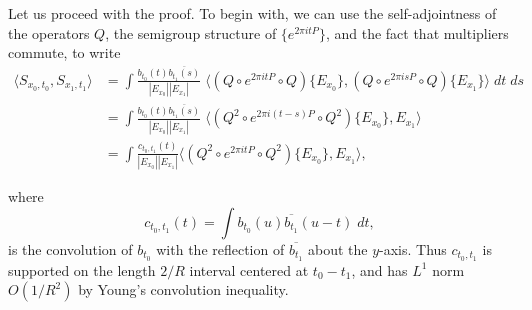 Let us proceed with the proof. To begin with, we can use the self-adjointness of the operators $Q$, the semigroup structure of $\{ e^{2 \pi i t P} \}$, and the fact that multipliers commute, to write
%
\begin{align*}
    \langle {S\!}_{x_0,t_0}, {S\!}_{x_1,t_1} \rangle &= \int \frac{b_{t_0}(t) \overline{b_{t_1}(s)}}{|E_{x_0}| |E_{x_1}|}\; \Big\langle (Q \circ e^{2 \pi i t P} \circ Q) \{ E_{x_0} \}, (Q \circ e^{2 \pi i s P} \circ Q) \{ E_{x_1} \} \Big\rangle\; dt\; ds\\
    &= \int \frac{b_{t_0}(t) \overline{b_{t_1}(s)}}{|E_{x_0}| |E_{x_1}|}\; \Big\langle (Q^2 \circ e^{2 \pi i (t - s) P} \circ Q^2) \{ E_{x_0} \}, E_{x_1} \Big\rangle\\
    &= \int \frac{c_{t_0,t_1}(t)}{|E_{x_0}||E_{x_1}|} \Big\langle (Q^2 \circ e^{2 \pi i t P} \circ Q^2) \{ E_{x_0} \}, E_{x_1} \Big\rangle,
\end{align*}
%
\begin{comment}

The wave propogators $\{ e^{2 \pi i t P} \}$ form a unitary semigroup. As a result, the Lax parametrix $\{ W(t) \}$ also satisfy the semigroup property \emph{modulo smoothing operators}, i.e. there exists a Schwartz operator $B(t,s)$ whose kernel $B(t,s,x,y)$ is smooth, such that
%
\[ W(s)^* \circ W(t) = W(t - s) + B(t,s). \]
%
This smoothness implies that
%
\[ \| \mathcal{P}_\lambda \{ B(t,s,\cdot,y) \} \|_{L^\infty(S^d)} \lesssim_N \lambda^{-N}, \]
%
and this together with the Weyl Law and the triangle inequality is sufficient to conclude that the kernel $K(t,s,x,y)$ of $Q \circ B(t,s)$ satisfies bounds of the form
%
\[ |K(t,s,x,y)| = \left| \sum \beta(\lambda / R) \mathcal{P}_\lambda \{ B(t,s,\cdot,y) \} \right| \lesssim_N R^{-N}. \]
%
Schur's Lemma, applied to $Q \circ B(t,s)$, together with the uniform boundedness of $Q$, implies that
%
\[ \| (Q \circ B(t,s) \circ Q) \{ E_{x_0} \} \|_{L^2(S^d)} \lesssim_N R^{-N} |E_{x_0}|^{1/2} \]
%
and so Cauchy-Schwartz implies that
%
\begin{align*}
    &\left| \int b_{t_0}(t) \overline{b_{t_1}(s)} \langle (Q \circ B(t,s) \circ Q) \{ E_{x_0} \}, E_{x_1} \rangle\; dt\; ds \right|\\
    &\quad \lesssim_N R^{-N} \int |b_{t_0}(t)| |b_{t_1}(s)| |E_{x_0}|^{1/2} |E_{x_1}|^{1/2}\; dt\; ds\\
    &\quad\lesssim_N C_p(h)^2 R^{-N}.
\end{align*}

\end{comment}
%
where
%
\[ c_{t_0,t_1}(t) = \int b_{t_0}(u) \overline{b_{t_1}}(u - t)\; dt, \]
%
is the convolution of $b_{t_0}$ with the reflection of $\overline{b_{t_1}}$ about the $y$-axis. Thus $c_{t_0,t_1}$ is supported on the length $2/R$ interval centered at $t_0 - t_1$, and has $L^1$ norm $O(1/R^2)$ by Young's convolution inequality.

